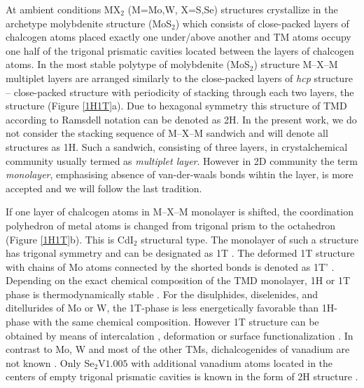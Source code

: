 \documentclass[a4paperm]{article}
\begin{document}
At ambient conditions MX$_2$ (M=Mo,W, X=S,Se) structures crystallize in the archetype molybdenite structure (MoS$_2$) which consists of close-packed layers of chalcogen atoms placed exactly one under/above another and TM atoms occupy one half of the  trigonal prismatic cavities located between the layers of chalcogen atoms. 
In the most stable polytype of molybdenite (MoS$_2$) structure M--X--M multiplet layers are arranged similarly to the close-packed layers of {\it hcp} structure -- close-packed structure with periodicity of stacking through each two layers, the structure (Figure \ref{1H1T}a).
Due to hexagonal symmetry this structure of TMD according to Ramsdell notation can be denoted as 2H.
In the present work, we do not consider the stacking sequence of M--X--M sandwich and will denote all structures as 1H.
Such a sandwich, consisting of three layers, in crystalchemical community usually termed as {\it multiplet layer}.
However in 2D community the term {\it monolayer}, emphasising absence of van-der-waals bonds wihtin the layer, is more accepted and we will follow the last tradition. 

If one layer of chalcogen atoms in M--X--M monolayer is shifted, the coordination polyhedron of metal atoms is changed from trigonal prism to the octahedron (Figure \ref{1H1T}b).
This is CdI$_2$ structural type. 
The monolayer of such a structure has trigonal symmetry and can be designated as 1T \cite{huang2020recent}. 
The deformed 1T structure with chains of Mo atoms connected by the shorted bonds is denoted as 1T' \cite{huang2020recent}.
Depending on the exact chemical composition of the TMD monolayer, 1H or 1T phase is thermodynamically stable \cite{ataca2012stable}. 
For the disulphides, diselenides, and ditellurides of Mo or W, the  1T-phase is less energetically favorable than 1H-phase with the same chemical composition. 
However 1T structure can be obtained by means of intercalation \cite{kan2014structures, wang2014atomic}, deformation \cite{duerloo2014structural} or surface functionalization \cite{tang2015stabilization, voiry2015covalent}. 
In contrast to Mo, W and most of the other TMs, dichalcogenides of vanadium are not known \cite{murphy1977preparation, le1979elaboration}. 
Only Se$_2$V$1.005$ with additional vanadium atoms located in the centers of empty trigonal prismatic cavities is known in the form of 2H structure \cite{rigoult1982}.
\end{document}
